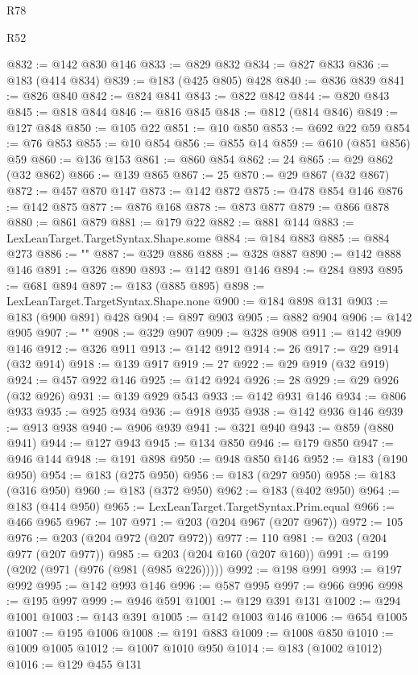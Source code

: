\begin{lexlean}{R78}
\begin{lexlean}{R52}
\begin{coremodule}
{{{{{{{{{{{{{{{{{{{{{{{{{{{{{{{{{{{{{{{{{{{{{{{{{{{{{{{{{{{{{{{{{{{{{{{{{{{{{{{{{{{{{{{{{{{{{{{{{{{{{{{{{{{{{{{{{{{{{{{{{{{{{{{{{{{{{{{{{{{{{{{{{{{{{{{{{{{{{{{{{{{{{{{{{{{{{{{{{{{{{{{{{{{{{{{{{{{{{{@832 := @142 @830 @146
@833 := @829 @832
@834 := @827 @833
@836 := @183 (@414 @834)
@839 := @183 (@425 @805) @428
@840 := @836 @839
@841 := @826 @840
@842 := @824 @841
@843 := @822 @842
@844 := @820 @843
@845 := @818 @844
@846 := @816 @845
@848 := @812 (@814 @846)
@849 := @127 @848
@850 := @105 @22
@851 := @10 @850
@853 := @692 @22 @59
@854 := @76 @853
@855 := @10 @854
@856 := @855 @14
@859 := @610 (@851 @856) @59
@860 := @136 @153
@861 := @860 @854
@862 := 24
@865 := @29 @862 (@32 @862)
@866 := @139 @865
@867 := 25
@870 := @29 @867 (@32 @867)
@872 := @457 @870 @147
@873 := @142 @872
@875 := @478 @854 @146
@876 := @142 @875
@877 := @876 @168
@878 := @873 @877
@879 := @866 @878
@880 := @861 @879
@881 := @179 @22
@882 := @881 @144
@883 := LexLeanTarget.TargetSyntax.Shape.some
@884 := @184 @883
@885 := @884 @273
@886 := "{"
@887 := @329 @886
@888 := @328 @887
@890 := @142 @888 @146
@891 := @326 @890
@893 := @142 @891 @146
@894 := @284 @893
@895 := @681 @894
@897 := @183 (@885 @895)
@898 := LexLeanTarget.TargetSyntax.Shape.none
@900 := @184 @898 @131
@903 := @183 (@900 @891) @428
@904 := @897 @903
@905 := @882 @904
@906 := @142 @905
@907 := "}"
@908 := @329 @907
@909 := @328 @908
@911 := @142 @909 @146
@912 := @326 @911
@913 := @142 @912
@914 := 26
@917 := @29 @914 (@32 @914)
@918 := @139 @917
@919 := 27
@922 := @29 @919 (@32 @919)
@924 := @457 @922 @146
@925 := @142 @924
@926 := 28
@929 := @29 @926 (@32 @926)
@931 := @139 @929 @543
@933 := @142 @931 @146
@934 := @806 @933
@935 := @925 @934
@936 := @918 @935
@938 := @142 @936 @146
@939 := @913 @938
@940 := @906 @939
@941 := @321 @940
@943 := @859 (@880 @941)
@944 := @127 @943
@945 := @134 @850
@946 := @179 @850
@947 := @946 @144
@948 := @191 @898
@950 := @948 @850 @146
@952 := @183 (@190 @950)
@954 := @183 (@275 @950)
@956 := @183 (@297 @950)
@958 := @183 (@316 @950)
@960 := @183 (@372 @950)
@962 := @183 (@402 @950)
@964 := @183 (@414 @950)
@965 := LexLeanTarget.TargetSyntax.Prim.equal
@966 := @466 @965
@967 := 107
@971 := @203 (@204 @967 (@207 @967))
@972 := 105
@976 := @203 (@204 @972 (@207 @972))
@977 := 110
@981 := @203 (@204 @977 (@207 @977))
@985 := @203 (@204 @160 (@207 @160))
@991 := @199 (@202 (@971 (@976 (@981 (@985 @226)))))
@992 := @198 @991
@993 := @197 @992
@995 := @142 @993 @146
@996 := @587 @995
@997 := @966 @996
@998 := @195 @997
@999 := @946 @591
@1001 := @129 @391 @131
@1002 := @294 @1001
@1003 := @143 @391
@1005 := @142 @1003 @146
@1006 := @654 @1005
@1007 := @195 @1006
@1008 := @191 @883
@1009 := @1008 @850
@1010 := @1009 @1005
@1012 := @1007 @1010 @950
@1014 := @183 (@1002 @1012)
@1016 := @129 @455 @131
}}}}}}}}}}}}}}}}}}}}}}}}}}}}}}}}}}}}}}}}}}}}}}}}}}}}}}}}}}}}}}}}}}}}}}}}}}}}}}}}}}}}}}}}}}}}}}}}}}}}}}}}}}}}}}}}}}}}}}}}}}}}}}}}}}}}}}}}}}}}}}}}}}}}}}}}}}}}}}}}}}}}}}}}}}}}}}}}}}}}}}}}}}}}}}}}}}}}}}
\end{coremodule}
\end{lexlean}
\end{lexlean}
